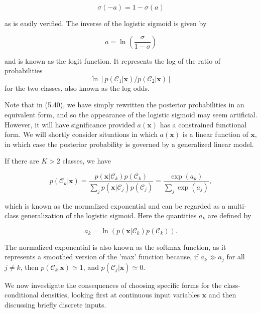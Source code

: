 \documentclass{article}
\begin{document}
\begin{equation}
\sigma(-a)=1-\sigma(a)
\tag{5.43}
\end{equation}

as is easily verified. The inverse of the logistic sigmoid is given by

\begin{equation}
a=\ln\left(\frac{\sigma}{1-\sigma}\right)
\tag{5.44}
\end{equation}

and is known as the logit function. It represents the log of the ratio of probabilities 
$$
\ln[p(\mathcal{C}_{1}|\mathbf{x})/p(\mathcal{C}_{2}|\mathbf{x})]
$$ 
for the two classes, also known as the log odds.

Note that in (5.40), we have simply rewritten the posterior probabilities in an equivalent form, and so the appearance of the logistic sigmoid may seem artificial. However, it will have significance provided $a(\mathbf{x})$ has a constrained functional form. We will shortly consider situations in which $a(\mathbf{x})$ is a linear function of $\mathbf{x}$, in which case the posterior probability is governed by a generalized linear model.

If there are $K>2$ classes, we have

\begin{equation}
p(\mathcal{C}_{k}|\mathbf{x}) = \frac{p(\mathbf{x}|\mathcal{C}_{k})p(\mathcal{C}_{k})}{\sum_{j}p(\mathbf{x}|\mathcal{C}_{j})p(\mathcal{C}_{j})} = \frac{\exp(a_{k})}{\sum_{j}\exp(a_{j})},
\tag{5.45}
\end{equation}

which is known as the normalized exponential and can be regarded as a multi-class generalization of the logistic sigmoid. Here the quantities $a_{k}$ are defined by

\begin{equation}
a_{k}=\ln\left(p(\mathbf{x}|\mathcal{C}_{k})p(\mathcal{C}_{k})\right).
\tag{5.46}
\end{equation}

The normalized exponential is also known as the softmax function, as it represents a smoothed version of the 'max' function because, if $a_{k}\gg a_{j}$ for all $j\neq k$, then $p(\mathcal{C}_{k}|\mathbf{x})\simeq 1$, and $p(\mathcal{C}_{j}|\mathbf{x})\simeq 0$.

We now investigate the consequences of choosing specific forms for the class-conditional densities, looking first at continuous input variables $\mathbf{x}$ and then discussing briefly discrete inputs.
\end{document}
